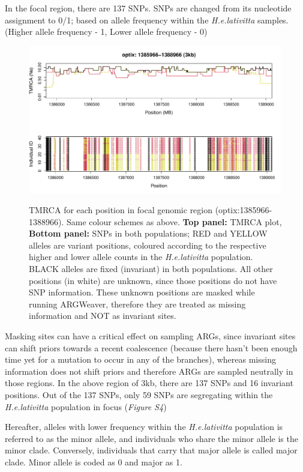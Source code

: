 \documentclass[
]{article}
\begin{document}
In the focal region, there are 137 SNPs. SNPs are changed from its
nucleotide assignment to 0/1; based on allele frequency within the
\emph{H.e.lativitta} samples. (Higher allele frequency - 1, Lower allele
frequency - 0)

\begin{figure}
{\centering \includegraphics[width=0.99\textwidth]{figS4-focal-SNPs/TMRCA-1} 
}

\caption{ \footnotesize TMRCA for each position in focal genomic region (optix:1385966-1388966). Same colour schemes as above. \textbf{Top panel:} TMRCA plot, \textbf{Bottom panel:} SNPs in both populations; RED and YELLOW alleles are variant positions, coloured according to the respective higher and lower allele counts in the \textit{H.e.lativitta} population. BLACK alleles are fixed (invariant) in both populations. All other positions (in white) are unknown, since those positions do not have SNP information. These unknown positions are masked while running ARGWeaver, therefore they are treated as missing information and NOT as invariant sites.}\label{fig:figS4-focal-SNPs/TMRCA}
\end{figure}

Masking sites can have a critical effect on sampling ARGs, since
invariant sites can shift priors towards a recent coalescence (because
there hasn't been enough time yet for a mutation to occur in any of the
branches), whereas missing information does not shift priors and
therefore ARGs are sampled neutrally in those regions. In the above
region of 3kb, there are 137 SNPs and 16 invariant positions. Out of the
137 SNPs, only 59 SNPs are segregating within the \emph{H.e.lativitta}
population in focus (\emph{Figure S4})

Hereafter, alleles with lower frequency within the
\emph{H.e.lativitta} population is referred to as the minor allele, and
individuals who share the minor allele is the minor clade. Conversely,
individuals that carry that major allele is called major clade. Minor
allele is coded as 0 and major as 1.
\end{document}
